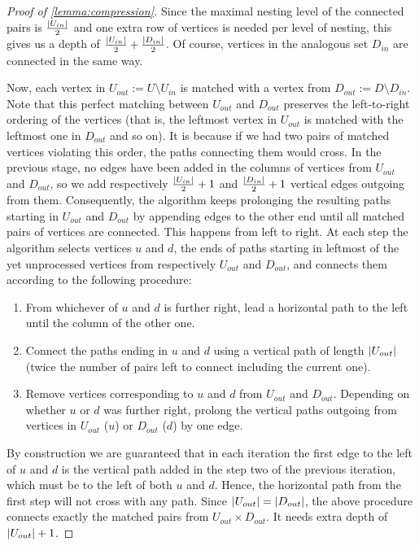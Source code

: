\begin{proof}[Proof of \cref{lemma:compression}]
    Since the maximal nesting level of the connected pairs is $\frac{\left| U_{in} \right|}{2}$ and one extra row of vertices is needed per level of nesting,
    this gives us a depth of $\frac{\left| U_{in} \right|}{2} + \frac{\left| D_{in} \right|}{2}$.
    Of course, vertices in the analogous set $D_{in}$ are connected in the same way.
    
    Now, each vertex in $U_{out} := U \setminus U_{in}$ is matched with a vertex from $D_{out} := D \setminus D_{in}$.
    Note that this perfect matching between $U_{out}$ and $D_{out}$ preserves the left-to-right ordering of the vertices
    (that is, the leftmost vertex in $U_{out}$ is matched with the leftmost one in $D_{out}$ and so on).
    It is because if we had two pairs of matched vertices violating this order, the paths connecting them would cross.
    In the previous stage, no edges have been added in the columns of vertices from $U_{out}$ and $D_{out}$, so we add respectively $\frac{\left| U_{in} \right|}{2} + 1$ and $\frac{\left| D_{in} \right|}{2} + 1$ vertical edges outgoing from them.
    Consequently, the algorithm keeps prolonging the resulting paths starting in $U_{out}$ and $D_{out}$ by appending edges to the other end until all matched pairs of vertices are connected. This happens from left to right. At each step the algorithm selects vertices $u$ and $d$, the ends of paths starting in leftmost of the yet unprocessed vertices from respectively $U_{out}$ and $D_{out}$, and connects them according to the following procedure:
    \begin{enumerate}[nosep]
    \item From whichever of $u$ and $d$ is further right, lead a horizontal path to the left until the column of the other one.
    \item Connect the paths ending in $u$ and $d$ using a vertical path of length $\left| U_{out} \right|$ (twice the number of pairs left to connect including the current one).
    \item Remove vertices corresponding to $u$ and $d$ from $U_{out}$ and $D_{out}$.
    Depending on whether $u$ or $d$ was further right, prolong the vertical paths outgoing from vertices in $U_{out}$ ($u$) or $D_{out}$ ($d$) by one edge.
    \end{enumerate}
    
    By construction we are guaranteed that in each iteration the first edge to the left of $u$ and $d$ is
    the vertical path added in the step two of the previous iteration,
    which must be to the left of both $u$ and $d$.
    Hence, the horizontal path from the first step will not cross with any path.
    Since $\left| U_{out} \right| = \left| D_{out} \right|$, the above procedure connects exactly the matched pairs from $U_{out} \times D_{out}$.
    It needs extra depth of $\left| U_{out} \right| + 1$.
    

\end{proof}
